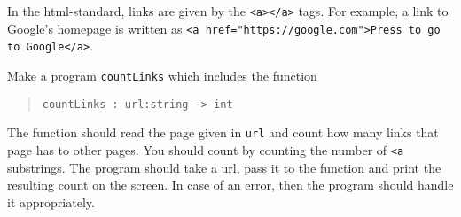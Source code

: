 In the html-standard, links are given by the \lstinline!<a></a>! tags. For example, a link to Google's homepage is written as \lstinline[language=console]!<a href="https://google.com">Press to go to Google</a>!.

Make a program \lstinline[language=console]{countLinks} which includes
the function
\begin{quote}
  \mbox{\lstinline!countLinks : url:string -> int!}
\end{quote}
The function should read the page given in \lstinline!url! and count
how many links that page has to other pages. You should count by
counting the number of \lstinline!<a! substrings. The program should
take a url, pass it to the function and print the resulting count on
the screen. In case of an error, then the program should handle it
appropriately.

